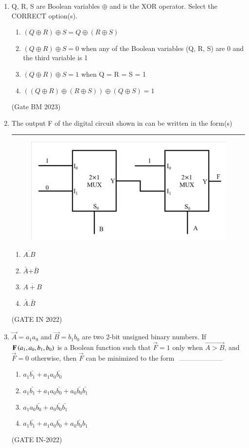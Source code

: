 \begin{enumerate}[label=\arabic*.,ref=\theenumi]
\item Q, R, S are Boolean variables  $ \oplus$ and is the XOR operator. Select the CORRECT option(s).

\begin{enumerate}
\item $(Q  \oplus  R)  \oplus  S = Q  \oplus  (R  \oplus  S) $
\item $(Q  \oplus  R)  \oplus  S = 0$ when any of the Boolean variables (Q, R, S) are 0 and the third variable is 1
\item $(Q  \oplus  R)  \oplus  S = 1$ when Q = R = S = 1
\item $((Q  \oplus  R)  \oplus  (R  \oplus  S))  \oplus  (Q  \oplus  S) = 1$
\end{enumerate}
\hfill{(Gate BM 2023)}

\item The output F of the digital circuit shown 
	in 
	can be written in the form(s)\rule{2cm}{0.5pt}
    \begin{figure}[!ht]
        \centering
        \includegraphics[width=\columnwidth]{figs/gate_in_2022_q23.jpg}
        \caption{}
\label{fig:GATE IN 2022}
    \end{figure}
    \begin{enumerate}
        \item $\overline{A.B}$
        \item $\bar{A}$+$\bar{B}$
        \item $\overline{A + B}$
        \item $\bar{A}$.$\bar{B}$
    \end{enumerate}
    \hfill (GATE IN 2022)

\item $\vec{A}=a_1a_0$ and $\vec{B}=b_1b_0$ are two 2-bit unsigned binary numbers. If $\mathbf{F}\left(a_1,a_0,b_1,b_0\right)$ is a Boolean function such that $\vec{F} = 1$ only when $\vec{A > B}$, and $\vec{F} = 0$ otherwise, then $\vec{F}$ can be minimized to the form $\rule{2.5cm}{0.10mm}$
\begin{enumerate}
\item $a_1\bar{b_1}+a_1a_0\bar{b_0}$
\item $a_1\bar{b_1}+a_1a_0\bar{b_0}+a_0\bar{b_0}\bar{b_1}$
\item $a_1a_0\bar{b_0}+a_0\bar{b_0}\bar{b_1}$
\item $a_1\bar{b_1}+a_1a_0\bar{b_0}+a_0\bar{b_0}b_1$
\end{enumerate}
\hfill(GATE IN-2022)


\end{enumerate}
